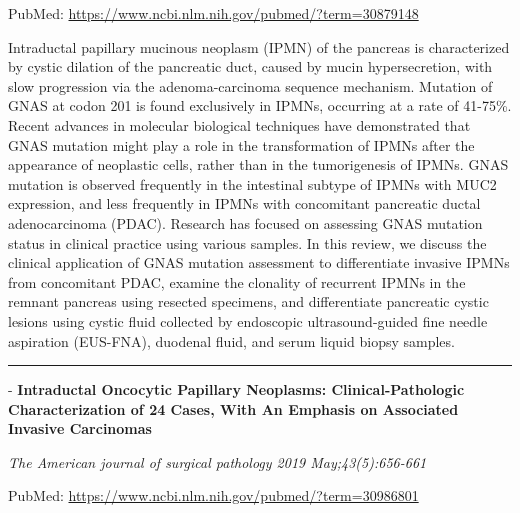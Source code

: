\documentclass[]{article}
\begin{document}
PubMed: \url{https://www.ncbi.nlm.nih.gov/pubmed/?term=30879148}

Intraductal papillary mucinous neoplasm (IPMN) of the pancreas is
characterized by cystic dilation of the pancreatic duct, caused by mucin
hypersecretion, with slow progression via the adenoma-carcinoma sequence
mechanism. Mutation of GNAS at codon 201 is found exclusively in IPMNs,
occurring at a rate of 41-75\%. Recent advances in molecular biological
techniques have demonstrated that GNAS mutation might play a role in the
transformation of IPMNs after the appearance of neoplastic cells, rather
than in the tumorigenesis of IPMNs. GNAS mutation is observed frequently
in the intestinal subtype of IPMNs with MUC2 expression, and less
frequently in IPMNs with concomitant pancreatic ductal adenocarcinoma
(PDAC). Research has focused on assessing GNAS mutation status in
clinical practice using various samples. In this review, we discuss the
clinical application of GNAS mutation assessment to differentiate
invasive IPMNs from concomitant PDAC, examine the clonality of recurrent
IPMNs in the remnant pancreas using resected specimens, and
differentiate pancreatic cystic lesions using cystic fluid collected by
endoscopic ultrasound-guided fine needle aspiration (EUS-FNA), duodenal
fluid, and serum liquid biopsy samples.

{}

{}

\begin{center}\rule{0.5\linewidth}{\linethickness}\end{center}

 - \textbf{Intraductal Oncocytic Papillary Neoplasms:
Clinical-Pathologic Characterization of 24 Cases, With An Emphasis on
Associated Invasive Carcinomas}

\emph{The American journal of surgical pathology 2019 May;43(5):656-661}

PubMed: \url{https://www.ncbi.nlm.nih.gov/pubmed/?term=30986801}
\end{document}
